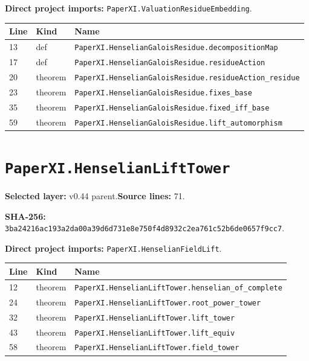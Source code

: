\documentclass[10pt,oneside]{book}
\begin{document}
\textbf{Direct project imports:} \nolinkurl{PaperXI.ValuationResidueEmbedding}.

\begin{longtable}{@{}p{}p{}p{}@{}}\toprule Line&Kind&Name\\\midrule\endhead

13&def&\nolinkurl{PaperXI.HenselianGaloisResidue.decompositionMap}\\

17&def&\nolinkurl{PaperXI.HenselianGaloisResidue.residueAction}\\

20&theorem&\nolinkurl{PaperXI.HenselianGaloisResidue.residueAction_residue}\\

23&theorem&\nolinkurl{PaperXI.HenselianGaloisResidue.fixes_base}\\

35&theorem&\nolinkurl{PaperXI.HenselianGaloisResidue.fixed_iff_base}\\

59&theorem&\nolinkurl{PaperXI.HenselianGaloisResidue.lift_automorphism}\\

\bottomrule\end{longtable}

\section{\texorpdfstring{\nolinkurl{PaperXI.HenselianLiftTower}}{PaperXI.HenselianLiftTower}}\label{module:PaperXI.HenselianLiftTower}

\textbf{Selected layer:} v0.44 parent.\quad\textbf{Source lines:} 71.\par\textbf{SHA-256:} {\scriptsize\nolinkurl{3ba24216ac193a2da00a39d6d731e8e750f4d8932c2ea761c52b6de0657f9cc7}}.


\textbf{Direct project imports:} \nolinkurl{PaperXI.HenselianFieldLift}.

\begin{longtable}{@{}p{}p{}p{}@{}}\toprule Line&Kind&Name\\\midrule\endhead

12&theorem&\nolinkurl{PaperXI.HenselianLiftTower.henselian_of_complete}\\

24&theorem&\nolinkurl{PaperXI.HenselianLiftTower.root_power_tower}\\

32&theorem&\nolinkurl{PaperXI.HenselianLiftTower.lift_tower}\\

43&theorem&\nolinkurl{PaperXI.HenselianLiftTower.lift_equiv}\\

58&theorem&\nolinkurl{PaperXI.HenselianLiftTower.field_tower}\\

\bottomrule\end{longtable}
\end{document}
